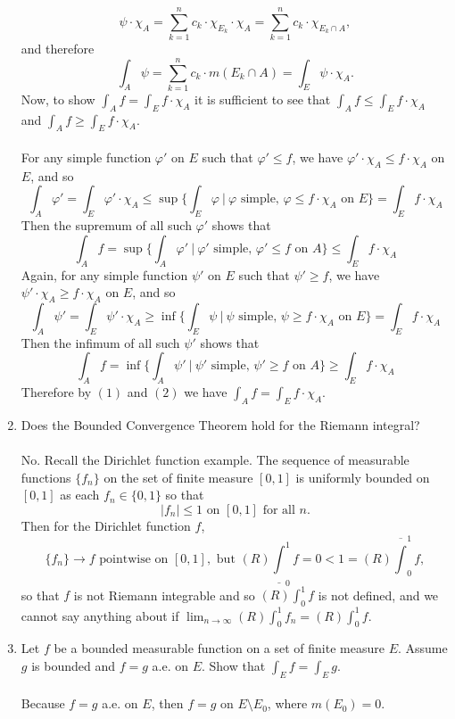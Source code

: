 \begin{enumerate}
    \[
        \psi\cdot\chi_A=\sum_{k=1}^nc_k\cdot \chi_{E_k}\cdot\chi_{A}=\sum_{k=1}^nc_k\cdot \chi_{E_k\cap A},
    \]
    and therefore 
    \[
        \int_A\psi=\sum_{k=1}^n c_k\cdot m(E_k\cap A)=\int_E\psi\cdot\chi_A.
    \]
    Now, to show $\int_Af=\int_Ef\cdot\chi_A$ it is sufficient to see that $\int_Af\le\int_Ef\cdot\chi_A$ and $\int_Af\ge\int_Ef\cdot\chi_A$.\\ 
    \\For any simple function $\varphi'$ on $E$ such that $\varphi'\le f$, we have $\varphi'\cdot\chi_A\le f\cdot\chi_A$ on $E$, and so
    \[
        \int_A\varphi'=\int_E\varphi'\cdot\chi_A\le\sup\biggl\{\int_E\varphi\ |\ \varphi\text{ simple, }\varphi\le f\cdot\chi_A\text{ on }E\biggr\}=\int_Ef\cdot\chi_A
    \]
    Then the supremum of all such $\varphi'$ shows that
    \[
        \int_Af=\sup\biggl\{\int_A\varphi'\ |\ \varphi'\text{ simple, }\varphi'\le f\text{ on }A\biggr\}\le\int_Ef\cdot\chi_A\tag{1}
    \]
    Again, for any simple function $\psi'$ on $E$ such that $\psi'\ge f$, we have $\psi'\cdot\chi_A\ge f\cdot\chi_A$ on $E$, and so
    \[
        \int_A\psi'=\int_E\psi'\cdot\chi_A\ge\inf\biggl\{\int_E\psi\ |\ \psi\text{ simple, }\psi\ge f\cdot\chi_A\text{ on }E\biggr\}=\int_Ef\cdot\chi_A
    \]
    Then the infimum of all such $\psi'$ shows that
    \[
        \int_Af=\inf\biggl\{\int_A\psi'\ |\ \psi'\text{ simple, }\psi'\ge f\text{ on }A\biggr\}\ge\int_Ef\cdot\chi_A\tag{2}
    \]
    Therefore by $(1)$ and $(2)$ we have $\int_Af=\int_Ef\cdot\chi_A$.
    \item Does the Bounded Convergence Theorem hold for the Riemann integral?\\
    \\No. Recall the Dirichlet function example. 
    The sequence of measurable functions $\{f_n\}$ on the set of finite measure $[0,1]$ is uniformly bounded on $[0,1]$ as each $f_n\in\{0,1\}$ so that 
    \[
        |f_n|\le1\text{ on }[0,1]\text{ for all }n. 
    \]
    Then for the Dirichlet function $f$,
    \[
        \{f_n\}\to f\text{ pointwise on }[0,1],\text{ but }(R)\underline\int_0^1f=0<1=(R)\overline\int_0^1f,
    \]
    so that $f$ is not Riemann integrable and so $(R)\int_0^1f$ is not defined, and we cannot say anything about if $\lim_{n\to\infty}(R)\int_0^1f_n=(R)\int_0^1f$.
    \item Let $f$ be a bounded measurable function on a set of finite measure $E$. Assume $g$ is bounded and $f=g$ a.e. on $E$. Show that $\int_Ef=\int_Eg$.\\
    \\Because $f=g$ a.e. on $E$, then $f=g$ on $E\setminus E_0$, where $m(E_0)=0$.

\end{enumerate}

